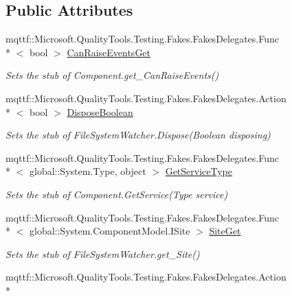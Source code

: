 \subsection*{Public Attributes}
\begin{DoxyCompactItemize}
\item 
mqttf\-::\-Microsoft.\-Quality\-Tools.\-Testing.\-Fakes.\-Fakes\-Delegates.\-Func\\*
$<$ bool $>$ \hyperlink{class_system_1_1_i_o_1_1_fakes_1_1_stub_file_system_watcher_a7f95e45ba59b8d0ff40fd86cbf7ed878}{Can\-Raise\-Events\-Get}
\begin{DoxyCompactList}\small\item\em Sets the stub of Component.\-get\-\_\-\-Can\-Raise\-Events()\end{DoxyCompactList}\item 
mqttf\-::\-Microsoft.\-Quality\-Tools.\-Testing.\-Fakes.\-Fakes\-Delegates.\-Action\\*
$<$ bool $>$ \hyperlink{class_system_1_1_i_o_1_1_fakes_1_1_stub_file_system_watcher_a82c6c4fb31b663dac782b74e65919e61}{Dispose\-Boolean}
\begin{DoxyCompactList}\small\item\em Sets the stub of File\-System\-Watcher.\-Dispose(\-Boolean disposing)\end{DoxyCompactList}\item 
mqttf\-::\-Microsoft.\-Quality\-Tools.\-Testing.\-Fakes.\-Fakes\-Delegates.\-Func\\*
$<$ global\-::\-System.\-Type, object $>$ \hyperlink{class_system_1_1_i_o_1_1_fakes_1_1_stub_file_system_watcher_ab190ccbfddf3c73782128ade7ec6b4db}{Get\-Service\-Type}
\begin{DoxyCompactList}\small\item\em Sets the stub of Component.\-Get\-Service(\-Type service)\end{DoxyCompactList}\item 
mqttf\-::\-Microsoft.\-Quality\-Tools.\-Testing.\-Fakes.\-Fakes\-Delegates.\-Func\\*
$<$ global\-::\-System.\-Component\-Model.\-I\-Site $>$ \hyperlink{class_system_1_1_i_o_1_1_fakes_1_1_stub_file_system_watcher_a2666a54edbb28773c828bb968f48c209}{Site\-Get}
\begin{DoxyCompactList}\small\item\em Sets the stub of File\-System\-Watcher.\-get\-\_\-\-Site()\end{DoxyCompactList}\item 
mqttf\-::\-Microsoft.\-Quality\-Tools.\-Testing.\-Fakes.\-Fakes\-Delegates.\-Action\\*

\end{DoxyCompactItemize}
